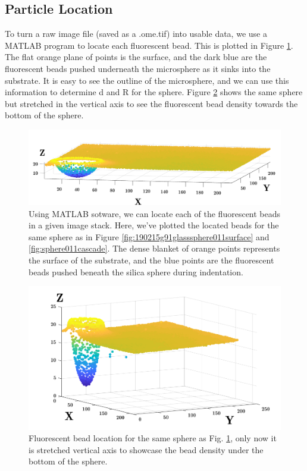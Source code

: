 \subsection{Particle Location}
To turn a raw image file (saved as a .ome.tif) into usable data, we use a MATLAB program to locate each fluorescent bead. This is plotted in Figure \ref{fig:particlelocatednormalized}. The flat orange plane of points is the surface, and the dark blue are the fluorescent beads pushed underneath the microsphere as it sinks into the substrate. It is easy to see the outline of the microsphere, and we can use this information to determine d and R for the sphere. 
Figure \ref{fig:particlelocatedstretched} shows the same sphere but stretched in the vertical axis to see the fluorescent bead density towards the bottom of the sphere. 
\begin{figure}[h]
	\centering
	\includegraphics[width=\linewidth]{Chapters/Figures/sphere011_ia/particle_located_normalized}
	\caption[Particle Located: Normalized-Axes]{Using MATLAB sotware, we can locate each of the fluorescent beads in a given image stack. Here, we've plotted the located beads for the same sphere as in Figure \ref{fig:190215g91glasssphere011surface} and \ref{fig:sphere011cascade}. The dense blanket of orange points represents the surface of the substrate, and the blue points are the fluorescent beads pushed beneath the silica sphere during indentation.}
	\label{fig:particlelocatednormalized}
\end{figure}


\begin{figure}[h!]
	\centering
	\includegraphics[width=\linewidth]{Chapters/Figures/sphere011_ia/particle_located_stretched}
	\caption[Particle Located: Stretched-Axes]{Fluorescent bead location for the same sphere as Fig.  \ref{fig:particlelocatednormalized}, only now it is stretched vertical axis to showcase the bead density under the bottom of the sphere.}
	\label{fig:particlelocatedstretched}
\end{figure}

